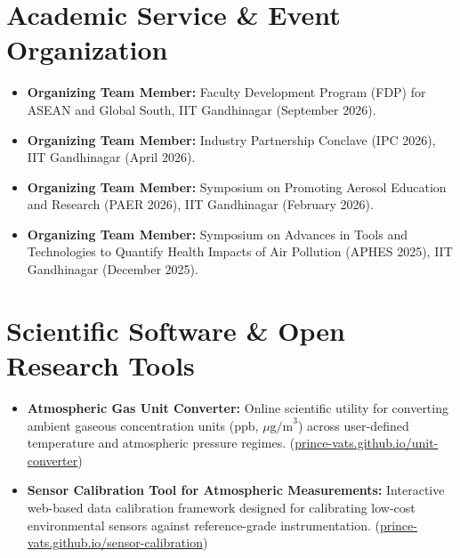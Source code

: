 \documentclass[10pt,a4paper]{article}
\begin{document}
\section*{Academic Service \& Event Organization}
\begin{itemize}
    \item \textbf{Organizing Team Member:} Faculty Development Program (FDP) for ASEAN and Global South, IIT Gandhinagar (September 2026).
    \item \textbf{Organizing Team Member:} Industry Partnership Conclave (IPC 2026), IIT Gandhinagar (April 2026).
    \item \textbf{Organizing Team Member:} Symposium on Promoting Aerosol Education and Research (PAER 2026), IIT Gandhinagar (February 2026).
    \item \textbf{Organizing Team Member:} Symposium on Advances in Tools and Technologies to Quantify Health Impacts of Air Pollution (APHES 2025), IIT Gandhinagar (December 2025).
\end{itemize}

\section*{Scientific Software \& Open Research Tools}
\begin{itemize}
    \item \textbf{Atmospheric Gas Unit Converter:} Online scientific utility for converting ambient gaseous concentration units ($\text{ppb}$, $\mu\text{g/m}^3$) across user-defined temperature and atmospheric pressure regimes. (\href{https://prince-vats.github.io/unit-converter/}{prince-vats.github.io/unit-converter})
    \item \textbf{Sensor Calibration Tool for Atmospheric Measurements:} Interactive web-based data calibration framework designed for calibrating low-cost environmental sensors against reference-grade instrumentation. (\href{https://prince-vats.github.io/sensor-calibration/}{prince-vats.github.io/sensor-calibration})
\end{itemize}

\end{document}
